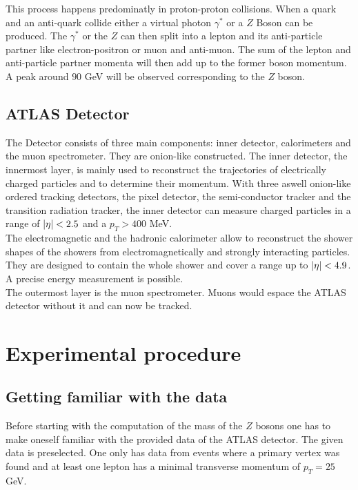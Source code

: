 \documentclass[12pt, a4paper, bibliography=totoc]{scrreprt}
\begin{document}
This process happens predominatly in proton-proton collisions.
When a quark and an anti-quark collide either a virtual photon $\gamma^\ast$ or a $Z$ Boson can be produced. 
The $\gamma^\ast$ or the $Z$ can then split into a lepton and its anti-particle partner like electron-positron or muon and anti-muon.
The sum of the lepton and anti-particle partner momenta will then add up to the former boson momentum. 
A peak around $90$ \si{GeV} will be observed corresponding to the $Z$ boson. 

\section{ATLAS Detector}
The Detector consists of three main components: inner detector, calorimeters and the muon spectrometer.
They are onion-like constructed. 
The inner detector, the innermost layer, is mainly used to reconstruct the trajectories of electrically charged particles and to determine their momentum. 
With three aswell onion-like ordered tracking detectors, the pixel detector, the semi-conductor tracker and the transition radiation tracker, the inner detector can measure charged particles in a range of $\abs{\eta} < 2.5$ and a $p_{T} > 400$ \si{MeV}.\\

The electromagnetic and the hadronic calorimeter allow to reconstruct the shower shapes of the showers from electromagnetically and strongly interacting particles. 
They are designed to contain the whole shower and cover a range up to $\abs{\eta} < 4.9$. 
A precise energy measurement is possible.\\

The outermost layer is the muon spectrometer.
Muons would espace the ATLAS detector without it and can now be tracked. 


\chapter{Experimental procedure}

\section{Getting familiar with the data}
Before starting with the computation of the mass of the $Z$ bosons one has to make oneself familiar with the provided data of the ATLAS detector. 
The given data is preselected. 
One only has data from events where a primary vertex was found and at least one lepton has a minimal transverse momentum of $p_{T} = 25$ \si{GeV}.
\end{document}
